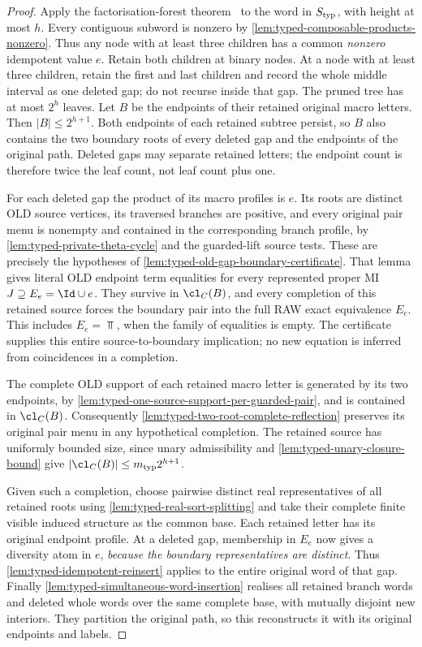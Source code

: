 \begin{proof}
Apply the factorisation-forest theorem~\cite{Kufleitner} to the word in
\(S_{\rm typ}\), with height at most \(h\).
Every contiguous subword is nonzero by
\cref{lem:typed-composable-products-nonzero}. Thus any node with at least
three children has a common \emph{nonzero} idempotent value \(e\).
Retain both children at binary nodes. At a node with at least three
children, retain the first and last children and record the whole
middle interval as one deleted gap; do not recurse inside that gap.
The pruned tree has at most \(2^h\) leaves. Let \(B\) be the endpoints
of their retained original macro letters. Then \(|B|\le 2^{h+1}\).
Both endpoints of each retained subtree persist, so \(B\) also contains
the two boundary roots of every deleted gap and the endpoints of the
original path. Deleted gaps may separate retained letters; the
endpoint count is therefore twice the leaf count, not leaf count plus one.

For each deleted gap the product of its macro profiles is \(e\).
Its roots are distinct OLD source vertices, its traversed branches are
positive, and every original pair menu is nonempty and contained in
the corresponding branch profile, by
\cref{lem:typed-private-theta-cycle} and the guarded-lift source tests.
These are precisely the hypotheses of
\cref{lem:typed-old-gap-boundary-certificate}. That lemma gives literal
OLD endpoint term equalities for every represented proper MI
\(J\supseteq E_e=\Id\cup e\). They survive in
\(\cl_C(B)\), and every completion of this retained source forces the
boundary pair into the full RAW exact equivalence \(E_e\).
This includes \(E_e=\Top\), when the family of equalities is empty.
The certificate supplies this entire source-to-boundary implication;
no new equation is inferred from coincidences in a completion.

The complete OLD support of each retained macro letter is generated
by its two endpoints, by
\cref{lem:typed-one-source-support-per-guarded-pair}, and is contained
in \(\cl_C(B)\). Consequently
\cref{lem:typed-two-root-complete-reflection} preserves its original
pair menu in any hypothetical completion. The retained source has
uniformly bounded size, since unary admissibility and
\cref{lem:typed-unary-closure-bound} give
\( |\cl_C(B)|\le m_{\rm typ}2^{h+1}\).

Given such a completion, choose pairwise distinct real representatives
of all retained roots using \cref{lem:typed-real-sort-splitting} and
take their complete finite visible induced structure as the common
base. Each retained letter has its original endpoint profile. At a
deleted gap, membership in \(E_e\) now gives a diversity atom in \(e\),
\emph{because the boundary representatives are distinct}.
Thus \cref{lem:typed-idempotent-reinsert} applies to the entire original
word of that gap. Finally
\cref{lem:typed-simultaneous-word-insertion} realises all retained
branch words and deleted whole words over the same complete base,
with mutually disjoint new interiors. They partition the original
path, so this reconstructs it with its original endpoints and labels.
\end{proof}


